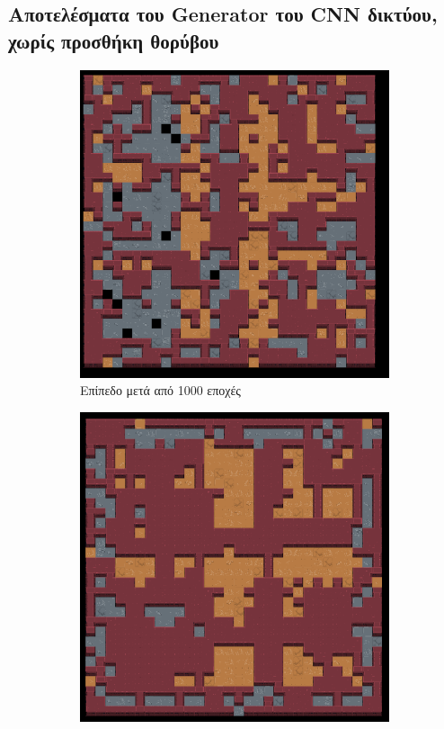 \subsection{Αποτελέσματα του Generator του CNN δικτύου, χωρίς προσθήκη θορύβου}
\begin{figure}[H]
\begin{subfigure}{.5\textwidth}
  \centering
  \includegraphics[width=.8\linewidth]{../images/result_images/cnn-gan/generator_1000.png}
  \caption{Επίπεδο μετά από 1000 εποχές}
  \label{fig:sfig1}
\end{subfigure}%
\begin{subfigure}{.5\textwidth}
  \centering
  \includegraphics[width=.8\linewidth]{../images/result_images/cnn-gan/generator_3000.png}

\end{subfigure}
\end{figure}
